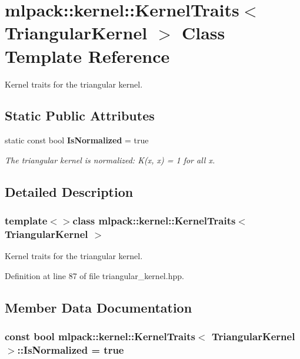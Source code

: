 \section{mlpack\-:\-:kernel\-:\-:Kernel\-Traits$<$ Triangular\-Kernel $>$ Class Template Reference}
\label{classmlpack_1_1kernel_1_1KernelTraits_3_01TriangularKernel_01_4}


Kernel traits for the triangular kernel.  


\subsection*{Static Public Attributes}
\begin{DoxyCompactItemize}
\item 
static const bool {\bf Is\-Normalized} = true
\begin{DoxyCompactList}\small\item\em The triangular kernel is normalized\-: K(x, x) = 1 for all x. \end{DoxyCompactList}\end{DoxyCompactItemize}


\subsection{Detailed Description}
\subsubsection*{template$<$$>$class mlpack\-::kernel\-::\-Kernel\-Traits$<$ Triangular\-Kernel $>$}

Kernel traits for the triangular kernel. 

Definition at line 87 of file triangular\-\_\-kernel.\-hpp.



\subsection{Member Data Documentation}
\subsubsection[{Is\-Normalized}]{\setlength{\rightskip}{0pt plus 5cm}const bool {\bf mlpack\-::kernel\-::\-Kernel\-Traits}$<$ {\bf Triangular\-Kernel} $>$\-::Is\-Normalized = true\hspace{0.3cm}{\ttfamily [static]}}\label{classmlpack_1_1kernel_1_1KernelTraits_3_01TriangularKernel_01_4_a443782152a0f1637fef710d41b84414f}


